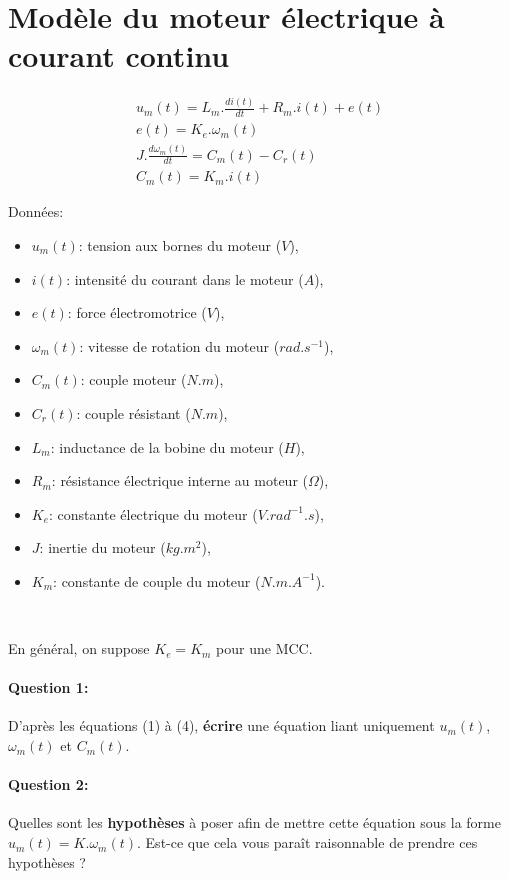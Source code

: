 



\\

\section{Modèle du moteur électrique à courant continu}

\begin{eqnarray}
u_m(t)=L_m.\frac{di(t)}{dt}+R_m.i(t)+e(t) \\
e(t)=K_e.\omega_m(t) \\
J.\frac{d\omega_m(t)}{dt}=C_m(t)-C_r(t) \\
C_m(t)=K_m.i(t)
\end{eqnarray}

Données:
\begin{itemize}
 \item $u_m(t)$: tension aux bornes du moteur ($V$),
 \item $i(t)$: intensité du courant dans le moteur ($A$),
 \item $e(t)$: force électromotrice ($V$),
 \item $\omega_m(t)$: vitesse de rotation du moteur ($rad.s^{-1}$),
 \item $C_m(t)$: couple moteur ($N.m$),
 \item $C_r(t)$: couple résistant ($N.m$),
 \item $L_m$: inductance de la bobine du moteur ($H$),
 \item $R_m$: résistance électrique interne au moteur ($\Omega$),
 \item $K_e$: constante électrique du moteur ($V.rad^{-1}.s$),
 \item $J$: inertie du moteur ($kg.m^2$),
 \item $K_m$: constante de couple du moteur ($N.m.A^{-1}$).
\end{itemize}

~\

En général, on suppose $K_e=K_m$ pour une MCC.

\paragraph{Question 1:} D'après les équations (1) à (4), \textbf{écrire} une équation liant uniquement $u_m(t)$, $\omega_m(t)$ et $C_m(t)$.

\paragraph{Question 2:} Quelles sont les \textbf{hypothèses} à poser afin de mettre cette équation sous la forme $u_m(t)=K.\omega_m(t)$. Est-ce que cela vous paraît raisonnable de prendre ces hypothèses ?

